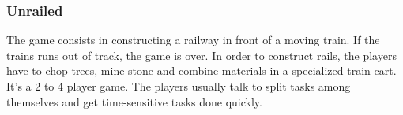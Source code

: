 \documentclass{article}
\begin{document}
\vspace{0.4cm}

\vfill
{}

\clearpage

\subsubsection{Unrailed}
The game consists in constructing a railway in front of a moving train. If the trains runs out of track, the game is over. In order to construct rails, the players have to chop trees, mine stone and combine materials in a specialized train cart. It's a 2 to 4 player game. The players  usually talk to split tasks among themselves and get time-sensitive tasks done quickly.

\vspace{0.4cm}
\end{document}
